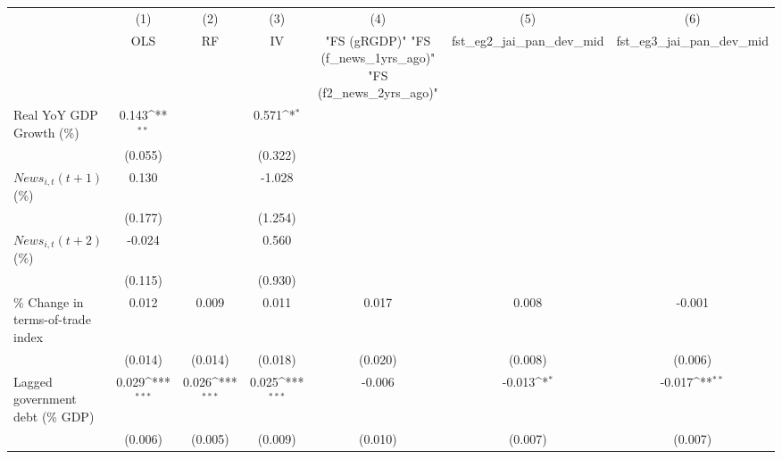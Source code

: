 {
\def\sym#1{\ifmmode^{#1}\else\(^{#1}\)\fi}
\begin{tabular}{l*{6}{c}}
\toprule
                    &\multicolumn{1}{c}{(1)}&\multicolumn{1}{c}{(2)}&\multicolumn{1}{c}{(3)}&\multicolumn{1}{c}{(4)}&\multicolumn{1}{c}{(5)}&\multicolumn{1}{c}{(6)}\\
                    &\multicolumn{1}{c}{OLS}&\multicolumn{1}{c}{RF}&\multicolumn{1}{c}{IV}&\multicolumn{1}{c}{ "FS (gRGDP)"  "FS (f_news_1yrs_ago)"  "FS (f2_news_2yrs_ago)" }&\multicolumn{1}{c}{fst_eg2_jai_pan_dev_mid}&\multicolumn{1}{c}{fst_eg3_jai_pan_dev_mid}\\
\midrule
Real YoY GDP Growth (\%)&       0.143\sym{**} &                     &       0.571\sym{*}  &                     &                     &                     \\
                    &     (0.055)         &                     &     (0.322)         &                     &                     &                     \\
\addlinespace
$ News_{i,t}(t+1)$ (\%)&       0.130         &                     &      -1.028         &                     &                     &                     \\
                    &     (0.177)         &                     &     (1.254)         &                     &                     &                     \\
\addlinespace
$ News_{i,t}(t+2)$ (\%)&      -0.024         &                     &       0.560         &                     &                     &                     \\
                    &     (0.115)         &                     &     (0.930)         &                     &                     &                     \\
\addlinespace
\% Change in terms-of-trade index&       0.012         &       0.009         &       0.011         &       0.017         &       0.008         &      -0.001         \\
                    &     (0.014)         &     (0.014)         &     (0.018)         &     (0.020)         &     (0.008)         &     (0.006)         \\
\addlinespace
Lagged government debt (\% GDP)&       0.029\sym{***}&       0.026\sym{***}&       0.025\sym{***}&      -0.006         &      -0.013\sym{*}  &      -0.017\sym{**} \\
                    &     (0.006)         &     (0.005)         &     (0.009)         &     (0.010)         &     (0.007)         &     (0.007)         \\

\end{tabular}}
